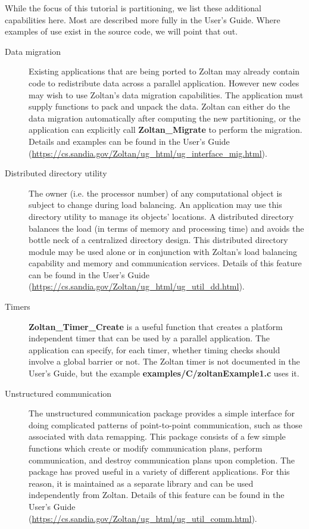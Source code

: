 While the focus of this tutorial is partitioning, we list these additional
capabilities here.  Most are described more fully in the User's Guide.
Where examples of use exist in the source code, we will point that out.

\begin{description}
\item [Data migration]
Existing applications that are being ported to Zoltan may already contain code to 
redistribute data across a parallel application.  However new codes may wish to
use Zoltan's data migration capabilities.  The application must supply functions
to pack and unpack the data.  Zoltan can either do the data migration automatically
after computing the new partitioning, or the application can explicitly call
\textbf{Zoltan\_Migrate} to perform the migration.  
Details and examples can be
found in the User's Guide
(\url{https://cs.sandia.gov/Zoltan/ug\_html/ug\_interface\_mig.html}).


\item [Distributed directory utility]
The owner (i.e. the processor number) of any computational object is subject to 
change during load balancing. An application may use this directory utility to 
manage its objects' locations. A distributed directory balances the load (in terms 
of memory and processing time) and avoids the bottle neck of a centralized directory design.
This distributed directory module may be used alone or in conjunction with Zoltan's 
load balancing capability and memory and communication services.
Details of this feature can be found in the User's Guide
(\url{https://cs.sandia.gov/Zoltan/ug\_html/ug\_util\_dd.html}).

\item [Timers]
\textbf{Zoltan\_Timer\_Create} is a useful function 
that creates a platform independent
timer that can be used by a parallel application.  The application can
specify, for each timer, whether timing checks should involve a
global barrier or not.  The Zoltan timer is not documented in the User's
Guide, but the example \textbf{examples/C/zoltanExample1.c} uses it.

\item [Unstructured communication]
The unstructured communication package provides a simple interface for 
doing complicated patterns of point-to-point communication, such as those 
associated with data remapping. This package consists of a few simple functions 
which create or modify communication plans, perform communication, and destroy 
communication plans upon completion. The package has proved useful in a 
variety of different applications. For this reason, it is maintained as a separate 
library and can be used independently from Zoltan.
Details of this feature can be found in the User's Guide
(\url{https://cs.sandia.gov/Zoltan/ug\_html/ug\_util\_comm.html}).


\end{description}
